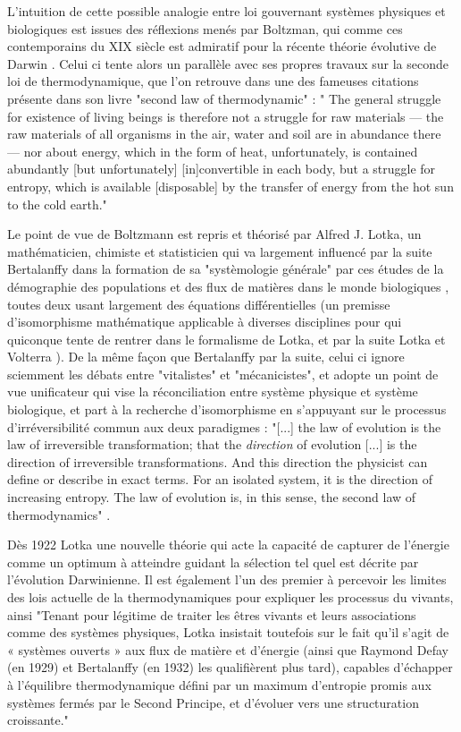 {L'intuition de cette possible analogie entre loi gouvernant systèmes physiques et biologiques est issues des réflexions menés par Boltzman, qui comme ces contemporains du XIX siècle est admiratif pour la récente théorie évolutive de Darwin \autocite[27]{Prigogine1996}. Celui ci tente alors un parallèle avec ses propres travaux sur la seconde loi de thermodynamique, que l'on retrouve dans une des fameuses citations présente dans son livre "second law of thermodynamic" : " The general struggle for existence of living beings is therefore not a struggle for raw materials — the raw materials of all organisms in the air, water and soil are in abundance there — nor about energy, which in the form of heat, unfortunately, is contained abundantly [but unfortunately] [in]convertible in each body, but a struggle for entropy, which is available [disposable] by the transfer of energy from the hot sun to the cold earth."

Le point de vue de Boltzmann est repris et théorisé par Alfred J. Lotka, un mathématicien, chimiste et statisticien qui va largement influencé par la suite Bertalanffy dans la formation de sa "systèmologie générale" \autocite[178]{Pouvreau2013} par ces études de la démographie des populations et des flux de matières dans le monde biologiques \autocite[545-546]{Pouvreau2013} , toutes deux usant largement des équations différentielles (un premisse d'isomorphisme mathématique applicable à diverses disciplines pour qui quiconque tente de rentrer dans le formalisme de Lotka, et par la suite Lotka et Volterra \autocite[550]{Pouvreau2013}). De la même façon que Bertalanffy par la suite, celui ci ignore sciemment les débats entre "vitalistes" et "mécanicistes", et adopte un point de vue unificateur qui vise la réconciliation entre système physique et système biologique, et part à la recherche d'isomorphisme en s'appuyant sur le processus d'irréversibilité commun aux deux paradigmes : "[...] the law of evolution is the law of irreversible transformation; that the \textit{direction} of evolution [...] is the direction of irreversible transformations. And this direction the physicist can define or describe in exact terms. For an isolated system, it is the direction of increasing entropy.  The law of evolution is, in this sense, the second law of thermodynamics" \autocite[26]{Lotka1925}.

Dès 1922 \autocite{Lotka1922a} \autocite{Lotka1922b} Lotka une nouvelle théorie qui acte la capacité de capturer de l'énergie comme un optimum à atteindre guidant la sélection tel quel est décrite par l'évolution Darwinienne. Il est également l'un des premier à percevoir les limites des lois actuelle de la thermodynamiques pour expliquer les processus du vivants, ainsi "Tenant pour légitime de traiter les êtres vivants et leurs associations comme des systèmes physiques, Lotka insistait toutefois sur le fait qu’il s’agit de « systèmes ouverts » aux flux de matière et d’énergie (ainsi que Raymond Defay (en 1929) et Bertalanffy (en 1932) les qualifièrent plus tard), capables d’échapper à l’équilibre thermodynamique défini par un maximum d’entropie promis aux systèmes fermés par le Second Principe, et d’évoluer vers une structuration croissante." \autocite[179]{Pouvreau2013}

}
